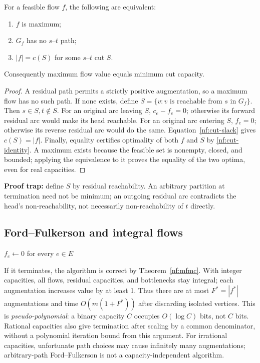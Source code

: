 \begin{theorem}\label{nf:mfmc}
For a feasible flow $f$, the following are equivalent:
\begin{enumerate}
 \item $f$ is maximum;
 \item $G_f$ has no $s$--$t$ path;
 \item $|f|=c(S)$ for some $s$--$t$ cut $S$.
\end{enumerate}
Consequently maximum flow value equals minimum cut capacity.
\end{theorem}
\begin{proof}
A residual path permits a strictly positive augmentation, so a maximum flow
has no such path. If none exists, define
$S=\{v:v\text{ is reachable from }s\text{ in }G_f\}$.
Then $s\in S,t\notin S$. For an original arc leaving $S$, $c_e-f_e=0$;
otherwise its forward residual arc would make its head reachable.
For an original arc entering $S$, $f_e=0$; otherwise its reverse residual arc
would do the same. Equation~\eqref{nf:cut-slack} gives $c(S)=|f|$.
Finally, equality certifies optimality of both $f$ and $S$ by
\eqref{nf:cut-identity}. A maximum exists because the feasible set is nonempty,
closed, and bounded; applying the equivalence to it proves the equality of
the two optima, even for real capacities.
\end{proof}
\textbf{Proof trap:} define $S$ by residual reachability. An arbitrary partition
at termination need not be minimum; an outgoing residual arc contradicts the
head's non-reachability, not necessarily non-reachability of $t$ directly.

\subsection{Ford--Fulkerson and integral flows}\label{nf:ff}
\begin{algorithm}[H]
\caption{Ford--Fulkerson: arbitrary residual augmenting paths}
$f_e\gets0$ for every $e\in E$\;
\;
\end{algorithm}
If it terminates, the algorithm is correct by Theorem~\ref{nf:mfmc}.
With integer capacities, all flows, residual capacities, and bottlenecks stay
integral; each augmentation increases value by at least 1. Thus there are at
most $F^*=|f^*|$ augmentations and time $O(m(1+F^*))$ after discarding isolated
vertices. This is \emph{pseudo-polynomial}: a binary capacity $C$ occupies
$O(\log C)$ bits, not $C$ bits. Rational capacities also give termination after
scaling by a common denominator, without a polynomial iteration bound from
this argument. For irrational capacities, unfortunate path choices may cause
infinitely many augmentations; arbitrary-path Ford--Fulkerson is not a
capacity-independent algorithm.


